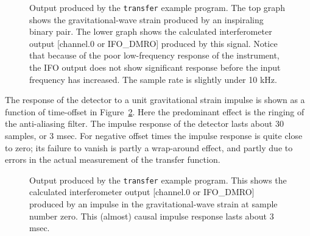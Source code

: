 \begin{figure}[hb]
\begin{center}
\caption{\label{f:detrespF}
Output produced by the {\tt transfer} example program.
The top graph shows the gravitational-wave strain produced by an
inspiraling binary pair.  The lower graph shows the calculated
interferometer output [channel.0  or IFO\_DMRO] produced by this
signal.  Notice that because of the poor low-frequency response of the
instrument, the IFO output does not show significant response before
the input frequency has increased.  The sample rate is slightly under
10 kHz.
}
\end{center}
\end{figure}

The response of the detector to a unit gravitational strain impulse is
shown as a function of time-offset in Figure~\ref{f:detresp2F}.  Here
the predominant effect is the ringing of the anti-aliasing filter.  The
impulse response of the detector lasts about 30 samples, or 3 msec.
For negative offset times the impulse response is quite close to zero;
its failure to vanish is partly a wrap-around effect, and partly due to
errors in the actual measurement of the transfer function.

\begin{figure}[hb]
\begin{center}
\caption{\label{f:detresp2F}
Output produced by the {\tt transfer} example program.
This shows the calculated
interferometer output [channel.0  or IFO\_DMRO] produced by
an impulse in the gravitational-wave strain at sample number zero.
This (almost) causal impulse response lasts about 3 msec.
}
\end{center}
\end{figure}

